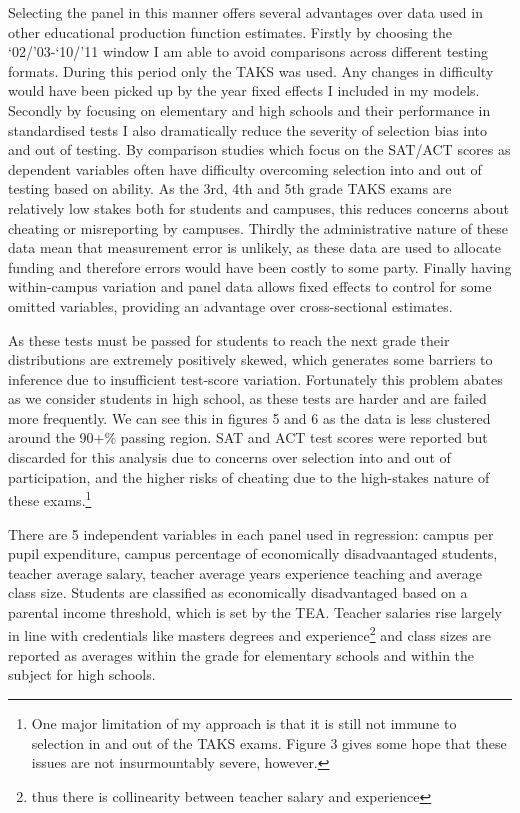 \documentclass[11pt]{article}
\begin{document}
Selecting the panel in this manner offers several advantages over data used in other educational production function estimates. Firstly by choosing the ‘02/’03-‘10/’11 window I am able to avoid comparisons across different testing formats. During this period only the TAKS was used. Any changes in difficulty would have been picked up by the year fixed effects I included in my models. Secondly by focusing on elementary and high schools and their performance in standardised tests I also dramatically reduce the severity of selection bias into and out of testing. By comparison studies which focus on the SAT/ACT scores as dependent variables often have difficulty overcoming selection into and out of testing based on ability. As the 3rd, 4th and 5th grade TAKS exams are relatively low stakes both for students and campuses, this reduces concerns about cheating or misreporting by campuses. Thirdly the administrative nature of these data mean that measurement error is unlikely, as these data are used to allocate funding and therefore errors would have been costly to some party. Finally having within-campus variation and panel data allows fixed effects to control for some omitted variables, providing an advantage over cross-sectional estimates. 

As these tests must be passed for students to reach the next grade their distributions are extremely positively skewed, which generates some barriers to inference due to insufficient test-score variation. Fortunately this problem abates as we consider students in high school, as these tests are harder and are failed more frequently. We can see this in figures 5 and 6 as the data is less clustered around the 90+\% passing region. SAT and ACT test scores were reported but discarded for this analysis due to concerns over selection into and out of participation, and the higher risks of cheating due to the high-stakes nature of these exams.\footnote{One major limitation of my approach is that it is still not immune to selection in and out of the TAKS exams. Figure 3 gives some hope that these issues are not insurmountably severe, however.}

There are 5 independent variables in each panel used in regression: campus per pupil expenditure, campus percentage of economically disadvaantaged students, teacher average salary, teacher average years experience teaching and average class size. Students are classified as economically disadvantaged based on a parental income threshold, which is set by the TEA. Teacher salaries rise largely in line with credentials like masters degrees and experience\footnote{thus there is collinearity between teacher salary and experience} and class sizes are reported as averages within the grade for elementary schools and within the subject for high schools.
\end{document}
